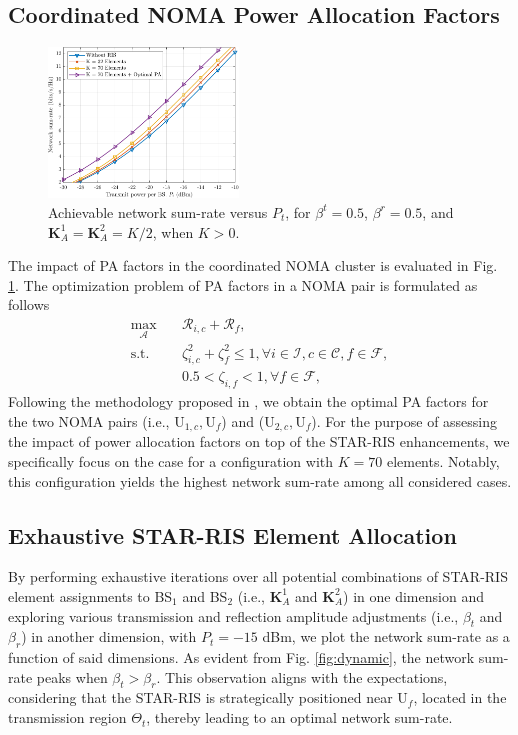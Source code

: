 \documentclass[conference]{IEEEtran}
\begin{document}
\subsection{Coordinated NOMA Power Allocation Factors}
\begin{figure}[t!]
    \centering
    \includegraphics[width=0.45\textwidth]{figs/sumrate.pdf}
    \caption{Achievable network sum-rate versus $P_{t}$, for $\beta^t=0.5$, $\beta^r=0.5$, and $\textbf{K}_A^1=\textbf{K}_A^2=K/2$, when $K > 0$.}
    \label{fig:sumrate}
\end{figure}
The impact of PA factors in the coordinated NOMA cluster is evaluated in Fig. \ref{fig:sumrate}. The optimization problem of PA factors in a NOMA pair is formulated as follows
\begin{align}
\max_{\mathbf{\mathcal{A}}} \quad & \mathcal{R}_{i,c} + \mathcal{R}_{f}, \label{eq:opt2} \\
\textrm{s.t.}
    \quad & \zeta_{i,c}^2 + \zeta_f^2\leq1, \forall i \in \mathcal{I}, c \in \mathcal{C}, f \in \mathcal{F}, \nonumber \\
    \quad & 0.5 < \zeta_{i,f} < 1, \forall f \in \mathcal{F}, \nonumber
\end{align}
Following the methodology proposed in \cite{fang2016energy}, we obtain the optimal PA factors for the two NOMA pairs (i.e., ${\text{U}_{1,c}, \text{U}_f}$) and (${\text{U}_{2,c}, \text{U}_f}$). For the purpose of assessing the impact of power allocation factors on top of the STAR-RIS enhancements, we specifically focus on the case for a configuration with $K=70$ elements. Notably, this configuration yields the highest network sum-rate among all considered cases.

\subsection{Exhaustive STAR-RIS Element Allocation}
By performing exhaustive iterations over all potential combinations of STAR-RIS element assignments to BS$_1$ and BS$_2$ (i.e., $\textbf{K}_A^1$ and $\textbf{K}_A^2$) in one dimension and exploring various transmission and reflection amplitude adjustments (i.e., $\beta_t$ and $\beta_r$) in another dimension, with $P_t=-15$ dBm, we plot the network sum-rate as a function of said dimensions. As evident from Fig. \ref{fig:dynamic}, the network sum-rate peaks when $\beta_t>\beta_r$. This observation aligns with the expectations, considering that the STAR-RIS is strategically positioned near U$_f$, located in the transmission region $\Theta_t$, thereby leading to an optimal network sum-rate.
\end{document}
